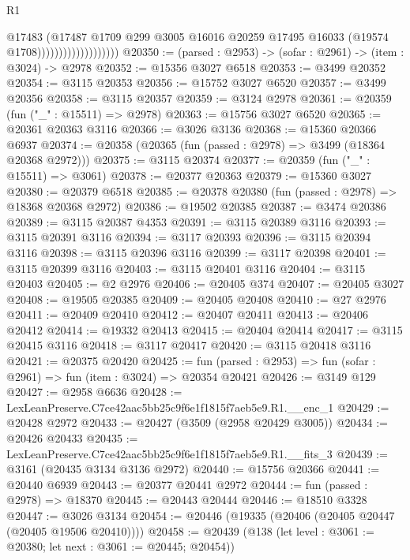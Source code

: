 \begin{lexlean}{R1}
\begin{coremodule}
                                      @17483
                                      (@17487
                                        @1709
                                        @299
                                        @3005
                                        @16016
                                        @20259
                                        @17495
                                        @16033
                                        (@19574 @1708)))))))))))))))))))
@20350 := (parsed : @2953) -> (sofar : @2961) -> (item : @3024) -> @2978
@20352 := @15356 @3027 @6518
@20353 := @3499 @20352
@20354 := @3115 @20353
@20356 := @15752 @3027 @6520
@20357 := @3499 @20356
@20358 := @3115 @20357
@20359 := @3124 @2978
@20361 := @20359 (fun ("_" : @15511) => @2978)
@20363 := @15756 @3027 @6520
@20365 := @20361 @20363 @3116
@20366 := @3026 @3136
@20368 := @15360 @20366 @6937
@20374 := @20358 (@20365 (fun (passed : @2978) => @3499 (@18364 @20368 @2972)))
@20375 := @3115 @20374
@20377 := @20359 (fun ("_" : @15511) => @3061)
@20378 := @20377 @20363
@20379 := @15360 @3027
@20380 := @20379 @6518
@20385 := @20378 @20380 (fun (passed : @2978) => @18368 @20368 @2972)
@20386 := @19502 @20385
@20387 := @3474 @20386
@20389 := @3115 @20387 @4353
@20391 := @3115 @20389 @3116
@20393 := @3115 @20391 @3116
@20394 := @3117 @20393
@20396 := @3115 @20394 @3116
@20398 := @3115 @20396 @3116
@20399 := @3117 @20398
@20401 := @3115 @20399 @3116
@20403 := @3115 @20401 @3116
@20404 := @3115 @20403
@20405 := @2 @2976
@20406 := @20405 @374
@20407 := @20405 @3027
@20408 := @19505 @20385
@20409 := @20405 @20408
@20410 := @27 @2976
@20411 := @20409 @20410
@20412 := @20407 @20411
@20413 := @20406 @20412
@20414 := @19332 @20413
@20415 := @20404 @20414
@20417 := @3115 @20415 @3116
@20418 := @3117 @20417
@20420 := @3115 @20418 @3116
@20421 := @20375 @20420
@20425 := fun (parsed : @2953) => fun (sofar : @2961) => fun (item : @3024) => @20354 @20421
@20426 := @3149 @129
@20427 := @2958 @6636
@20428 := LexLeanPreserve.C7ce42aac5bb25c9f6e1f1815f7aeb5e9.R1.__enc_1
@20429 := @20428 @2972
@20433 := @20427 (@3509 (@2958 @20429 @3005))
@20434 := @20426 @20433
@20435 := LexLeanPreserve.C7ce42aac5bb25c9f6e1f1815f7aeb5e9.R1.__fits_3
@20439 := @3161 (@20435 @3134 @3136 @2972)
@20440 := @15756 @20366
@20441 := @20440 @6939
@20443 := @20377 @20441 @2972
@20444 := fun (passed : @2978) => @18370
@20445 := @20443 @20444
@20446 := @18510 @3328
@20447 := @3026 @3134
@20454 := @20446 (@19335 (@20406 (@20405 @20447 (@20405 @19506 @20410))))
@20458 := @20439 (@138 (let level : @3061 := @20380; let next : @3061 := @20445; @20454))

\end{coremodule}
\end{lexlean}

